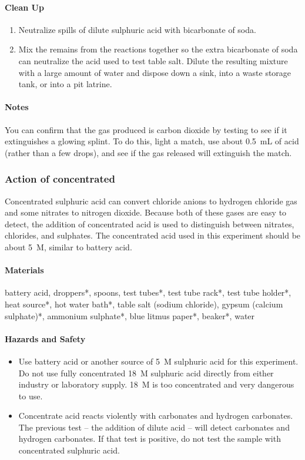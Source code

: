 \paragraph{Clean Up}
\begin{enumerate}
\item{Neutralize spills of dilute sulphuric acid with bicarbonate of soda.}
\item{Mix the remains from the reactions together so the extra bicarbonate of soda can neutralize the acid used to test table salt. Dilute the resulting mixture with a large amount of water and dispose down a sink, into a waste storage tank, or into a pit latrine.}
\end{enumerate}

\paragraph{Notes}
You can confirm that the gas produced is carbon dioxide by testing to see if it extinguishes a glowing splint. To do this, light a match, use about 0.5~mL of acid (rather than a few drops), and see if the gas released will extinguish the match.

\subsubsection{Action of concentrated \texorpdfstring{}{H2SO4}}

Concentrated sulphuric acid can convert chloride anions to hydrogen chloride gas and some nitrates to nitrogen dioxide. Because both of these gases are easy to detect, the addition of concentrated acid is used to distinguish between nitrates, chlorides, and sulphates. The concentrated acid used in this experiment should be about 5~M, similar to battery acid.

\paragraph{Materials}
battery acid, droppers*, spoons, test tubes*, test tube rack*, test tube holder*, heat source*, hot water bath*, table salt (sodium chloride), gypsum (calcium sulphate)*, ammonium sulphate*, blue litmus paper*, beaker*, water

\paragraph{Hazards and Safety}
\begin{itemize}
\item{Use battery acid or another source of 5~M sulphuric acid for this experiment. Do not use fully concentrated 18~M sulphuric acid directly from either industry or laboratory supply. 18~M is too concentrated and very dangerous to use.}
\item{Concentrate acid reacts violently with carbonates and hydrogen carbonates. The previous test -- the addition of dilute acid -- will detect carbonates and hydrogen carbonates. If that test is positive, do not test the sample with concentrated sulphuric acid.}
\end{itemize}

